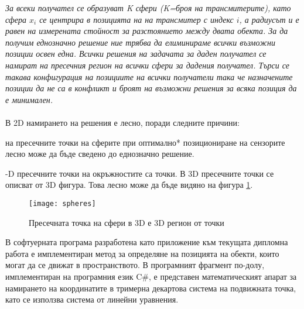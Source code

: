 \textit{За всеки получател се образуват K сфери (K=броя на трансмитерите), като сфера $x_i$ се центрира в позицията на на трансмитер с индекс $i$, а радиусът и е равен на измерената стойност за разстоянието между двата обекта. За да получим еднозначно решение ние трябва да елиминираме всички възможни позиции освен една. Всички решения на задачата за даден получател се намират на пресечния регион на всички сфери за дадения получател. Търси се такава конфигурация на позициите на всички получатели така че назначените позиции да не са в конфликт и броят на възможни решения за всяка позиция да е минимален.}\\\\

В 2D намирането на решения е лесно, поради следните причини:

\begin{enumerate}
     на пресечните точки на сферите при оптимално* позициониране на сензорите лесно може да бъде сведено до еднозначно решение.

    -D пресечните точки на окръжностите са точки. В 3D пресечните точки се описват от 3D фигура. Това лесно може да бъде видяно на фигура \ref{spheres}.
\end{enumerate}
\begin{figure}
    \centerline{\texttt{[image: spheres]}}
    \caption{Пресечната точка на сфери в 3D е 3D регион от точки}
    \label{spheres}
\end{figure}


В софтуерната програма разработена като приложение към текущата дипломна работа е имплементиран метод за определяне на позицията на обекти, които могат да се движат в пространството. В програмният фрагмент по-долу, имплементиран на програмния език C#, е представен математическият апарат за намирането на координатите в тримерна декартова система на подвижната точка, като се използва система от линейни уравнения. 

